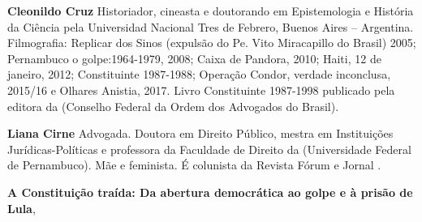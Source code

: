 \textbf{Cleonildo Cruz} Historiador, cineasta e doutorando em Epistemologia e História da Ciência pela Universidad Nacional Tres de Febrero, Buenos Aires – Argentina. Filmografia: Replicar dos Sinos (expulsão do Pe. Vito Miracapillo do Brasil) 2005; Pernambuco o golpe:1964-1979, 2008; Caixa de Pandora, 2010; Haiti, 12 de janeiro, 2012; Constituinte 1987-1988; Operação Condor, verdade inconclusa, 2015/16 e Olhares Anistia, 2017. Livro Constituinte 1987-1998 publicado pela editora da  (Conselho Federal da Ordem dos Advogados do Brasil).

\textbf{Liana Cirne} Advogada. Doutora em Direito Público, mestra em Instituições Jurídicas-Políticas e professora da Faculdade de Direito da  (Universidade Federal de Pernambuco). Mãe e feminista. É colunista da Revista Fórum e Jornal . 

\textbf{A Constituição traída: Da abertura democrática ao golpe e à prisão de Lula}, \lipsum[3]\par






